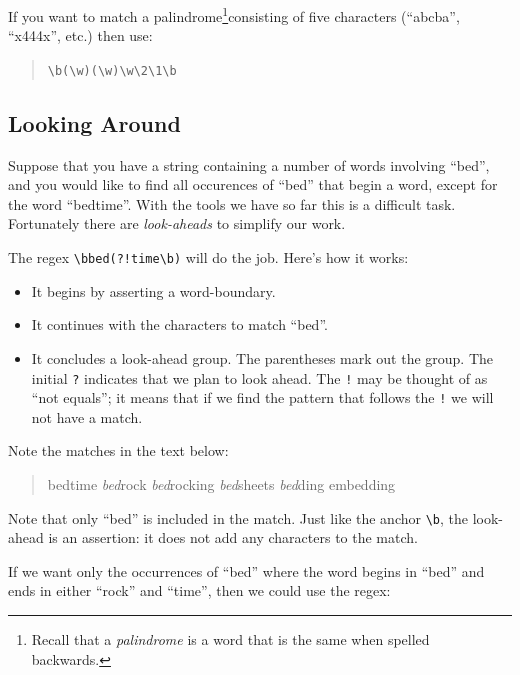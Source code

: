 \documentclass[]{book}
\providecommand{\tightlist}{%
  \setlength{\itemsep}{0pt}\setlength{\parskip}{0pt}}
\let\rmarkdownfootnote\footnote%
\def\footnote{\protect\rmarkdownfootnote}
\theoremstyle{definition}
\theoremstyle{definition}
\theoremstyle{remark}
\begin{document}
{If you want to match a palindrome\footnote{Recall that a
  \emph{palindrome} is a word that is the same when spelled backwards.}consisting
of five characters (``abcba'', ``x444x'', etc.) then use:

\begin{quote}
\texttt{\textbackslash{}b(\textbackslash{}w)(\textbackslash{}w)\textbackslash{}w\textbackslash{}2\textbackslash{}1\textbackslash{}b}
\end{quote}

\subsection{Looking Around}\label{looking-around}

Suppose that you have a string containing a number of words involving
``bed'', and you would like to find all occurences of ``bed'' that begin
a word, except for the word ``bedtime''. With the tools we have so far
this is a difficult task. Fortunately there are \emph{look-aheads}
 to simplify our work.

The regex \texttt{\textbackslash{}bbed(?!time\textbackslash{}b)} will do
the job. Here's how it works:

\begin{itemize}
\tightlist
\item
  It begins by asserting a word-boundary.
\item
  It continues with the characters to match ``bed''.
\item
  It concludes a look-ahead group. The parentheses mark out the group.
  The initial \texttt{?} indicates that we plan to look ahead. The
  \texttt{!} may be thought of as ``not equals''; it means that if we
  find the pattern that follows the \texttt{!} we will not have a match.
\end{itemize}

Note the matches in the text below:

\begin{quote}
bedtime \emph{bed}rock \emph{bed}rocking \emph{bed}sheets \emph{bed}ding
embedding
\end{quote}

Note that only ``bed'' is included in the match. Just like the anchor
\texttt{\textbackslash{}b}, the look-ahead is an assertion: it does not
add any characters to the match.

If we want only the occurrences of ``bed'' where the word begins in
``bed'' and ends in either ``rock'' and ``time'', then we could use the
regex:

}
\end{document}
